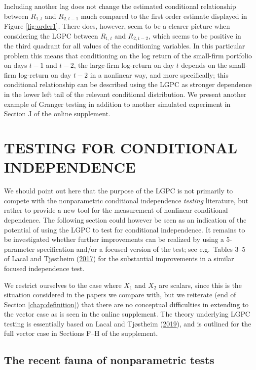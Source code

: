 \documentclass[
  12pt,
  letterpaper]{article}
\theoremstyle{definition}
\theoremstyle{definition}
\theoremstyle{definition}
\theoremstyle{remark}
\begin{document}
Including another lag does not change the estimated conditional relationship between \(R_{1,t}\) and \(R_{2,t-1}\) much compared to the first order estimate displayed in Figure \ref{fig:order1}. There does, however, seem to be a clearer picture when considering the LGPC between \(R_{1,t}\) and \(R_{2,t-2}\), which seems to be positive in the third quadrant for all values of the conditioning variables. In this particular problem this means that conditioning on the log return of the small-firm portfolio on days \(t-1\) and \(t-2\), the large-firm log-return on day \(t\) depends on the small-firm log-return on day \(t-2\) in a nonlinear way, and more specifically; this conditional relationship can be described using the LGPC as stronger dependence in the lower left tail of the relevant conditional distribution. We present another example of Granger testing in addition to another simulated experiment in Section J of the online supplement.

\hypertarget{chap:testing}{%
\section{TESTING FOR CONDITIONAL INDEPENDENCE}\label{chap:testing}}

We should point out here that the purpose of the LGPC is not primarily to compete with the nonparametric conditional independence \emph{testing} literature, but rather to provide a new tool for the measurement of nonlinear conditional dependence. The following section could however be seen as an indication of the potential of using the LGPC to test for conditional independence. It remains to be investigated whether further improvements can be realized by using a 5-parameter specification and/or a focused version of the test; see e.g.~Tables 3--5 of Lacal and Tjøstheim (\protect\hyperlink{ref-lacal2017local}{2017}) for the substantial improvements in a similar focused independence test.

We restrict ourselves to the case where \(X_1\) and \(X_2\) are scalars, since this is the situation considered in the papers we compare with, but we reiterate (end of Section \ref{chap:definition}) that there are no conceptual difficulties in extending to the vector case as is seen in the online supplement. The theory underlying LGPC testing is essentially based on Lacal and Tjøstheim (\protect\hyperlink{ref-lacal2018estimating}{2019}), and is outlined for the full vector case in Sections F--H of the supplement.

\hypertarget{fauna}{%
\subsection{The recent fauna of nonparametric tests}\label{fauna}}
\end{document}

